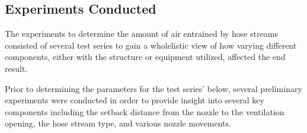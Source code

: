 \documentclass{article}
\begin{document}
\clearpage

\subsection{Experiments Conducted}

The experiments to determine the amount of air entrained by hose streams consisted of several test series to gain a wholelistic view of how varying different components, either with the structure or equipment utilized, affected the end result.

Prior to determining the parameters for the test series' below, several preliminary experiments were conducted in order to provide insight into several key components including the setback distance from the nozzle to the ventilation opening, the hose stream type, and various nozzle movements.
\end{document}
